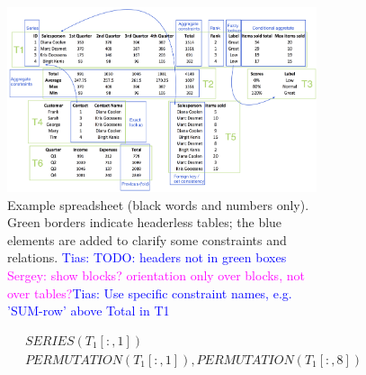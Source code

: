 \documentclass{IEEEtran}
\newcommand{\sergey}[1]{\textcolor{magenta}{{\sc Sergey:} #1}\xspace}
\newcommand{\tias}[1]{\textcolor{blue}{{\sc Tias:} #1}\xspace}
\newcommand{\range}[3]{\ensuremath{#1[#2,#3]}}
\newcommand{\rangeall}{:}
\newcommand{\ecperm}[1]{\ensuremath{\textit{PERMUTATION}(#1)}}
\newcommand{\ecseries}[1]{\ensuremath{\textit{SERIES}(#1)}}
\theoremstyle{definition}
\begin{document}

\begin{figure}[thb]

  \begin{subfigure}{.70\textwidth}
  \begin{center}
    \includegraphics[width=1\textwidth]{figures/Demo.png}
  \end{center}
  \vspace{-10pt}
  \caption{Example spreadsheet (black words and numbers only). Green borders indicate headerless tables; the blue elements are added to clarify some constraints and relations. \tias{TODO: headers not in green boxes} \sergey{show blocks? orientation only over blocks, not over tables?}\tias{Use specific constraint names, e.g. 'SUM-row' above Total in T1}}
  \label{fig:main_example}
\end{subfigure}
\hfill
\begin{subfigure}{.30\textwidth}
  {\footnotesize
    \begin{align*}
      &~\ecseries{\range{T_{1}}{\rangeall}{1}} \\
%
      &~\ecperm{\range{T_{1}}{\rangeall}{1}}, \ecperm{\range{T_{1}}{\rangeall}{8}} \\

\end{align*}}
\end{subfigure}
\end{figure}
\end{document}
